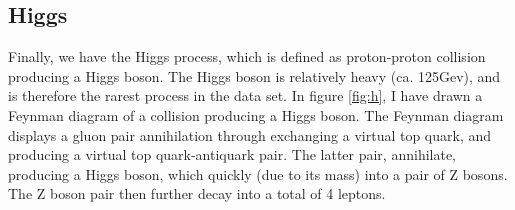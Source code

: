 \subsection*{Higgs}
Finally, we have the Higgs process, which is defined as proton-proton collision producing a Higgs boson. The Higgs boson is relatively heavy (ca. 125Gev), and is therefore
the rarest process in the data set. In figure \ref{fig:h}, I have drawn a Feynman diagram of a collision producing a Higgs boson. The Feynman diagram displays a gluon pair annihilation
through exchanging a virtual top quark, and producing a virtual top quark-antiquark pair. The latter pair, annihilate, producing a Higgs boson, which quickly (due to its mass) into a 
pair of Z bosons. The Z boson pair then further decay into a total of 4 leptons. 

\begin{figure}
\end{figure}
